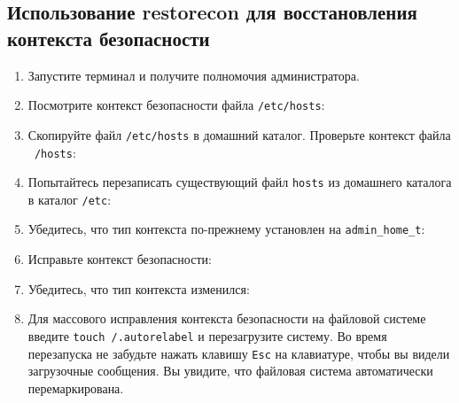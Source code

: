 \documentclass[12pt]{article}
\begin{document}
\subsection{Использование restorecon для восстановления контекста безопасности}
\begin{enumerate}
	\item Запустите терминал и получите полномочия администратора.
	\item Посмотрите контекст безопасности файла \texttt{/etc/hosts}:
	\item Скопируйте файл \texttt{/etc/hosts} в домашний каталог. Проверьте контекст файла \texttt{~/hosts}:
	\item Попытайтесь перезаписать существующий файл \texttt{hosts} из домашнего каталога в каталог \texttt{/etc}:
	\item Убедитесь, что тип контекста по-прежнему установлен на \texttt{admin\_home\_t}:
	\item Исправьте контекст безопасности:
	\item Убедитесь, что тип контекста изменился:
	\item Для массового исправления контекста безопасности на файловой системе введите \texttt{touch /.autorelabel} и перезагрузите систему. Во время перезапуска не забудьте нажать клавишу \texttt{Esc} на клавиатуре, чтобы вы видели загрузочные сообщения. Вы увидите, что файловая система автоматически перемаркирована.
\end{enumerate}
\end{document}
